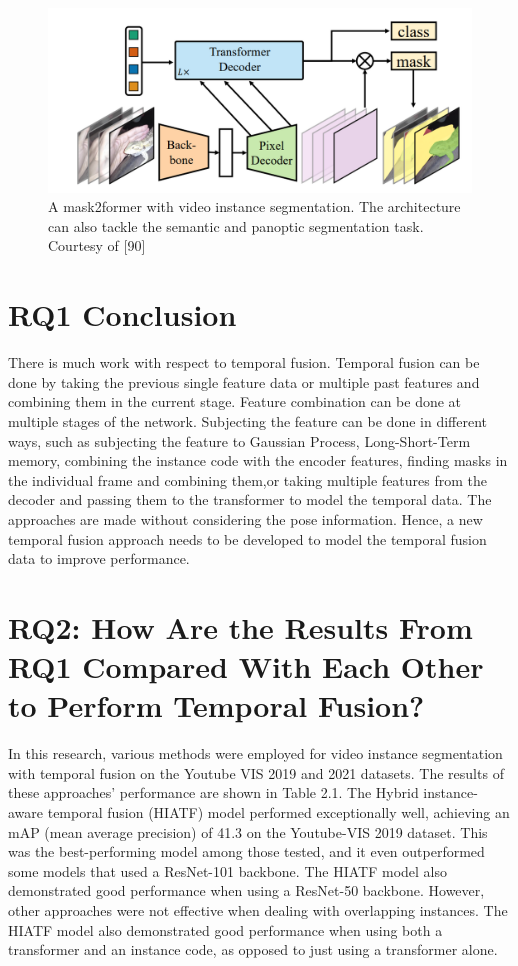     \begin{figure}
    	\centering
    	\includegraphics[width=13cm]{images/mask2former.png}
    	\caption{ A mask2former with video instance segmentation. The architecture can also tackle the semantic and panoptic segmentation task. Courtesy of [90]}
    	\label{fig:mask2former}
    \end{figure}	
    
    \section{RQ1 Conclusion}
    
    There is much work with respect to temporal fusion. Temporal fusion can be done by taking the previous single feature data or multiple past features and combining them in the current stage. Feature combination can be done at multiple stages of the network. Subjecting the feature can be done in different ways, such as subjecting the feature to Gaussian Process, Long-Short-Term memory, combining the instance code with the encoder features, finding masks in the individual frame and combining them,or taking multiple features from the decoder and passing them to the transformer to model the temporal data. The approaches are made without considering the pose information. Hence, a new temporal fusion approach needs to be developed to model the temporal fusion data to improve performance. 
    
    \section{RQ2: How Are the Results From RQ1 Compared With Each Other to Perform Temporal Fusion?}
    
	In this research, various methods were employed for video instance segmentation with temporal fusion on the Youtube VIS 2019 and 2021 datasets. The results of these approaches' performance are shown in Table 2.1. The Hybrid instance-aware temporal fusion (HIATF) model performed exceptionally well, achieving an mAP (mean average precision) of 41.3 on the Youtube-VIS 2019 dataset. This was the best-performing model among those tested, and it even outperformed some models that used a ResNet-101 backbone. The HIATF model also demonstrated good performance when using a ResNet-50 backbone. However, other approaches were not effective when dealing with overlapping instances. The HIATF model also demonstrated good performance when using both a transformer and an instance code, as opposed to just using a transformer alone.
	
